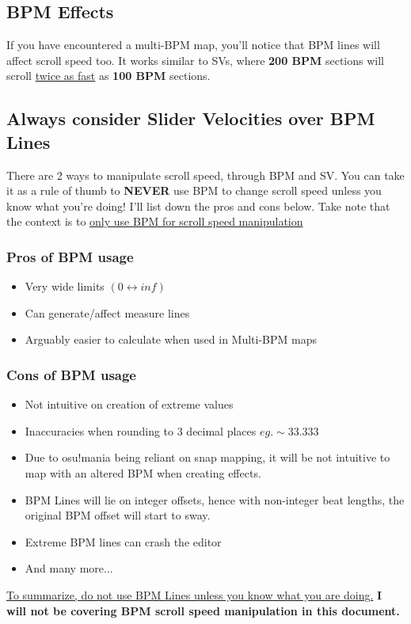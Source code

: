 \subsection{BPM Effects}
If you have encountered a multi-BPM map, you'll notice that BPM lines will affect scroll speed too. It works similar to SVs, where \textbf{200 BPM} sections will scroll \underline{twice as fast} as \textbf{100 BPM} sections.

\subsection{Always consider Slider Velocities over BPM Lines}
There are 2 ways to manipulate scroll speed, through BPM and SV. You can take it as a rule of thumb to \textbf{NEVER} use BPM to change scroll speed unless you know what you're doing! I'll list down the pros and cons below. \newline
Take note that the context is to \underline{only use BPM for scroll speed manipulation}

\subsubsection{Pros of BPM usage}
\begin{itemize}
    \item Very wide limits $(0 \longleftrightarrow inf)$
    \item Can generate/affect measure lines
    \item Arguably easier to calculate when used in Multi-BPM maps
\end{itemize}

\subsubsection{Cons of BPM usage}
\begin{itemize}
    \item Not intuitive on creation of extreme values
    \item Inaccuracies when rounding to 3 decimal places \textit{$eg. \sim 33.333$}
    \item Due to osu!mania being reliant on snap mapping, it will be not intuitive to map with an altered BPM when creating effects.
    \item BPM Lines will lie on integer offsets, hence with non-integer beat lengths, the original BPM offset will start to sway.
    \item Extreme BPM lines can crash the editor
    \item And many more...
\end{itemize}
\underline{To summarize, do not use BPM Lines unless you know what you are doing.} \newline
\textbf{I will not be covering BPM scroll speed manipulation in this document.}